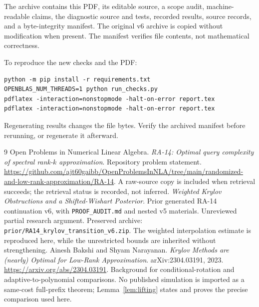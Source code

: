 \documentclass[11pt]{article}
\theoremstyle{definition}
\begin{document}
The archive contains this PDF, its editable source, a scope audit, machine-readable claims, the diagnostic source and tests, recorded results, source records, and a byte-integrity manifest. The original v6 archive is copied without modification when present. The manifest verifies file contents, not mathematical correctness.

To reproduce the new checks and the PDF:
\begin{verbatim}
python -m pip install -r requirements.txt
OPENBLAS_NUM_THREADS=1 python run_checks.py
pdflatex -interaction=nonstopmode -halt-on-error report.tex
pdflatex -interaction=nonstopmode -halt-on-error report.tex
\end{verbatim}
Regenerating results changes the file bytes. Verify the archived manifest before rerunning, or regenerate it afterward.

\begingroup\small\raggedright
\begin{thebibliography}{9}
 Open Problems in Numerical Linear Algebra. \emph{RA-14: Optimal query complexity of spectral rank-$k$ approximation}. Repository problem statement. \url{https://github.com/ajt60gaibb/OpenProblemsInNLA/tree/main/randomized-and-low-rank-approximation/RA-14}. A raw-source copy is included when retrieval succeeds; the retrieval status is recorded, not inferred.
 \emph{Weighted Krylov Obstructions and a Shifted-Wishart Posterior}. Prior generated RA-14 continuation v6, with \texttt{PROOF\_AUDIT.md} and nested v5 materials. Unreviewed partial research argument. Preserved archive: \texttt{prior/RA14\_krylov\_transition\_v6.zip}. The weighted interpolation estimate is reproduced here, while the unrestricted bounds are inherited without strengthening.
 Ainesh Bakshi and Shyam Narayanan. \emph{Krylov Methods are (nearly) Optimal for Low-Rank Approximation}. arXiv:2304.03191, 2023. \url{https://arxiv.org/abs/2304.03191}. Background for conditional-rotation and adaptive-to-polynomial comparisons. No published simulation is imported as a same-cost full-prefix theorem; Lemma~\ref{lem:lifting} states and proves the precise comparison used here.
\end{thebibliography}
\endgroup
\end{document}
